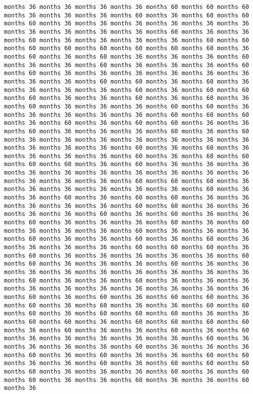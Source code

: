 \documentclass[11pt]{article}
\begin{document}
\begin{Verbatim}[commandchars=\\\{\}, frame=single, framerule=2mm, rulecolor=\color{outerrorbackground}]
months 36 months 36 months 36 months 36 months 60 months 60 months 60 months 36 months 36 months 36 months 60 months 36 months 60 months 60 months 60 months 36 months 36 months 36 months 36 months 36 months 36 months 36 months 36 months 36 months 36 months 60 months 36 months 36 months 60 months 36 months 36 months 36 months 36 months 60 months 60 months 60 months 60 months 60 months 60 months 60 months 60 months 36 months 60 months 36 months 60 months 36 months 36 months 36 months 60 months 36 months 36 months 60 months 36 months 36 months 36 months 60 months 60 months 36 months 36 months 36 months 36 months 36 months 36 months 36 months 36 months 60 months 60 months 36 months 60 months 36 months 36 months 36 months 36 months 60 months 36 months 60 months 60 months 60 months 36 months 36 months 60 months 36 months 60 months 36 months 60 months 36 months 36 months 36 months 60 months 60 months 36 months 36 months 36 months 36 months 36 months 60 months 60 months 60 months 36 months 60 months 36 months 60 months 60 months 36 months 36 months 60 months 36 months 36 months 36 months 60 months 36 months 60 months 36 months 36 months 36 months 36 months 36 months 36 months 36 months 36 months 36 months 36 months 60 months 36 months 60 months 36 months 36 months 36 months 36 months 60 months 36 months 60 months 60 months 60 months 60 months 36 months 60 months 36 months 36 months 36 months 36 months 36 months 36 months 36 months 36 months 36 months 36 months 36 months 36 months 36 months 60 months 60 months 60 months 36 months 36 months 36 months 36 months 36 months 36 months 60 months 36 months 36 months 60 months 36 months 60 months 60 months 36 months 36 months 36 months 36 months 36 months 60 months 60 months 36 months 36 months 36 months 36 months 60 months 36 months 60 months 36 months 36 months 60 months 36 months 36 months 36 months 60 months 36 months 60 months 36 months 36 months 36 months 60 months 36 months 36 months 36 months 60 months 36 months 36 months 60 months 36 months 60 months 36 months 36 months 36 months 36 months 60 months 60 months 60 months 36 months 60 months 36 months 36 months 36 months 36 months 36 months 60 months 60 months 36 months 36 months 36 months 60 months 36 months 36 months 36 months 36 months 36 months 36 months 36 months 36 months 36 months 60 months 36 months 36 months 60 months 36 months 36 months 36 months 36 months 36 months 36 months 36 months 36 months 36 months 36 months 60 months 36 months 60 months 36 months 60 months 60 months 36 months 60 months 36 months 60 months 36 months 36 months 60 months 60 months 60 months 36 months 60 months 60 months 60 months 36 months 36 months 60 months 60 months 36 months 60 months 60 months 60 months 60 months 36 months 60 months 36 months 36 months 60 months 36 months 60 months 36 months 36 months 36 months 36 months 36 months 60 months 36 months 36 months 36 months 36 months 60 months 36 months 36 months 36 months 60 months 36 months 60 months 36 months 36 months 60 months 60 months 36 months 36 months 60 months 36 months 60 months 60 months 60 months 60 months 36 months 36 months 36 months 60 months 36 months 60 months 60 months 36 months 36 months 60 months 36 months 36 months 60 months 36 
\end{Verbatim}
\end{document}
